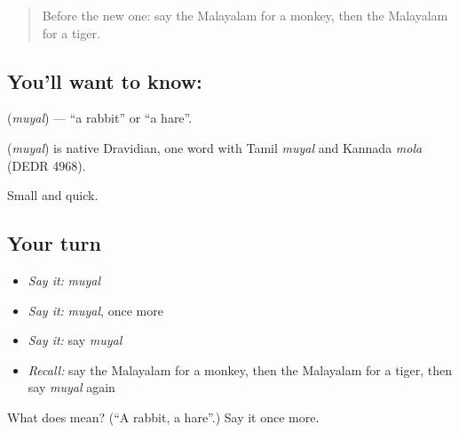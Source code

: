 \label{lesson:ML-C138-rabbit}



\begin{quote}
Before the new one: say the Malayalam for a monkey, then the Malayalam for a tiger.
\end{quote}

\subsection*{You'll want to know: }
\textbf{} (\emph{muyal}) — \textquotedblleft{}a rabbit\textquotedblright{} or \textquotedblleft{}a hare\textquotedblright{}.

\begin{cousinweb}
\textbf{} (\emph{muyal}) is native Dravidian, one word with Tamil \emph{muyal} and Kannada \emph{mola} (DEDR 4968).
\end{cousinweb}

\begin{grammarlens}[title={What you've built}]
Small and quick.
\end{grammarlens}

\subsection*{Your turn}
\begin{itemize}
\raggedright
  \item \emph{Say it:} \emph{muyal}
  \item \emph{Say it:} \emph{muyal}, once more
  \item \emph{Say it:} say \emph{muyal}
  \item \emph{Recall:} say the Malayalam for a monkey, then the Malayalam for a tiger, then say \emph{muyal} again
\end{itemize}

\begin{tcolorbox}[breakable,colback=teal!4,colframe=teal!35!black,title={Before you move on}]
What does  mean? (\textquotedblleft{}A rabbit, a hare\textquotedblright{}.) Say it once more.
\end{tcolorbox}
